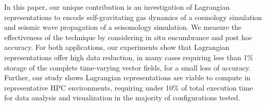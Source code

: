 In this paper, our unique contribution is an investigation of Lagrangian representations to encode self-gravitating gas dynamics of a cosmology simulation and seismic wave propagation of a seisomology simulation.
%
We measure the effectiveness of the technique by considering in situ encumbrance and post hoc accuracy.
%
For both applications, our experiments show that Lagrangian representations offer high data reduction, in many cases requiring less than 1\% storage of the complete time-varying vector fields, for a small loss of accuracy. 
%
Further, our study shows Lagrangian representations are viable to compute in representative HPC environments, requiring under 10\% of total execution time for data analysis and visualization in the majority of configurations tested. 
